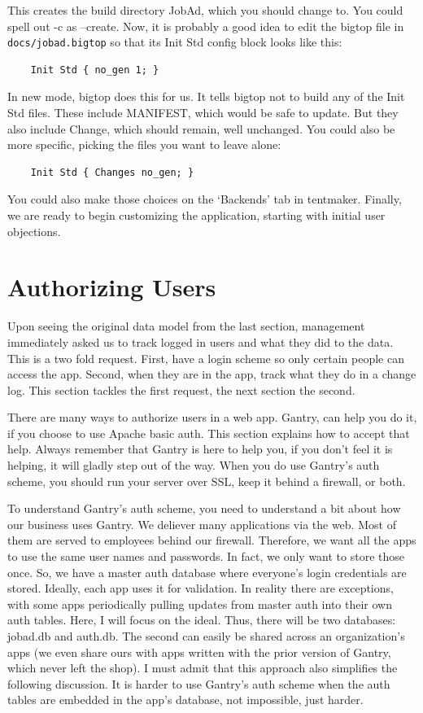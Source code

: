 This creates the build directory JobAd, which you should change to.
You could spell out -c as --create.  Now, it is probably a good idea to
edit the bigtop file in \verb+docs/jobad.bigtop+ so that its Init Std
config block looks like this:

\begin{verbatim}
    Init Std { no_gen 1; }
\end{verbatim}

In new mode, bigtop does this for us.  It tells bigtop not to build any
of the Init Std files.  These include MANIFEST, which would be safe to
update.  But they also include Change, which should remain, well unchanged.
You could also be more specific, picking the files you want to leave alone:

\begin{verbatim}
    Init Std { Changes no_gen; }
\end{verbatim}

You could also make those choices on the `Backends' tab in tentmaker.
Finally, we are ready to begin customizing the application, starting
with initial user objections.

\section{Authorizing Users}

Upon seeing the original data model from the last section, management
immediately asked us to track logged in users and what they did to the data.
This is a two fold request.  First, have a login scheme so only certain
people can access the app.  Second, when they are in the app, track what
they do in a change log.  This section tackles the first request, the next
section the second.

There are many ways to authorize users in a web app.  Gantry, can help you
do it, if you choose to use Apache basic auth.  This section explains how
to accept that help.  Always remember that Gantry is here to help you, if
you don't feel it is helping, it will gladly step out of the way.  When you
do use Gantry's auth scheme, you should run your server over SSL, keep it
behind a firewall, or both.

To understand Gantry's auth scheme, you need to understand a bit about
how our business uses Gantry.  We deliever many applications via the
web.  Most of them are served to employees behind our firewall.  Therefore,
we want all the apps to use the same user names and passwords.  In fact,
we only want to store those once.  So, we have a master auth database
where everyone's login credentials are stored.  Ideally, each app uses
it for validation.  In reality there are exceptions, with some apps
periodically pulling updates from master auth into their own auth tables.
Here, I will focus on the ideal.  Thus, there will be two databases:
jobad.db and auth.db.  The second can easily be shared across an
organization's apps (we even share ours with apps written with the
prior version of Gantry, which never left the shop).  I must admit that
this approach also simplifies the following discussion.  It is harder to
use Gantry's auth scheme when the auth tables are embedded in the app's
database, not impossible, just harder.

